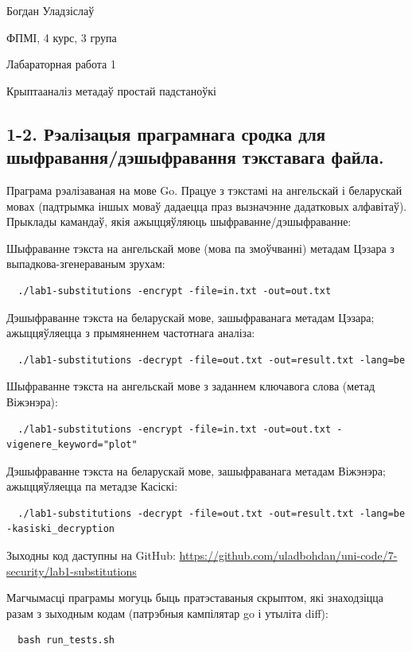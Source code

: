\documentclass{article}
\begin{document}
{\large

Богдан Уладзіслаў

ФПМІ, 4 курс, 3 група

\vspace{5mm}

Лабараторная работа 1

Крыптааналіз метадаў простай падстаноўкі

}

\vspace{5mm}

\subsection*{1-2. Рэалізацыя праграмнага сродка для шыфравання/дэшыфравання тэкставага файла.}

Праграма рэалізаваная на мове Go.
Працуе з тэкстамі на ангельскай і беларускай мовах (падтрымка іншых моваў
дадаецца праз вызначэнне дадатковых алфавітаў).
Прыклады камандаў, якія ажыццяўляюць шыфраванне/дэшыфраванне:

Шыфраванне тэкста на ангельскай мове (мова па змоўчванні) метадам Цэзара з
выпадкова-згенераваным зрухам:
\begin{verbatim}
  ./lab1-substitutions -encrypt -file=in.txt -out=out.txt
\end{verbatim}

Дэшыфраванне тэкста на беларускай мове, зашыфраванага метадам Цэзара;
ажыццяўляецца з прымяненнем частотнага аналіза:
\begin{verbatim}
  ./lab1-substitutions -decrypt -file=out.txt -out=result.txt -lang=be
\end{verbatim}

Шыфраванне тэкста на ангельскай мове з заданнем ключавога слова (метад Віжэнэра):
\begin{verbatim}
  ./lab1-substitutions -encrypt -file=in.txt -out=out.txt -vigenere_keyword="plot"
\end{verbatim}

Дэшыфраванне тэкста на беларускай мове, зашыфраванага метадам Віжэнэра;
ажыццяўляецца па метадзе Касіскі:
\begin{verbatim}
  ./lab1-substitutions -decrypt -file=out.txt -out=result.txt -lang=be -kasiski_decryption
\end{verbatim}

Зыходны код даступны на GitHub: \url{https://github.com/uladbohdan/uni-code/7-security/lab1-substitutions}

Магчымасці праграмы могуць быць пратэставаныя скрыптом, які знаходзіцца разам з
зыходным кодам (патрэбныя кампілятар go і утыліта diff):
\begin{verbatim}
  bash run_tests.sh
\end{verbatim}
\end{document}
